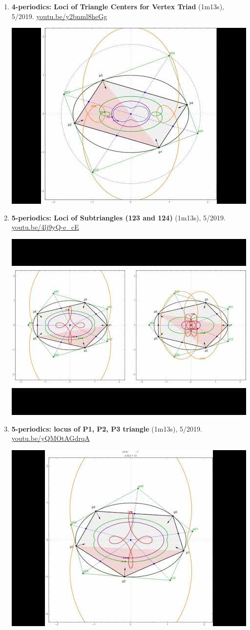 \documentclass[12pt]{article}
\begin{document}
\begin{enumerate}[resume]
\item \textbf{4-periodics: Loci of Triangle Centers for Vertex Triad} (1m13s), 5/2019. \href{https://youtu.be/y2bnml8heGg}{\url{youtu.be/y2bnml8heGg}}
\begin{center}\includegraphics[width=.5\textwidth]{pics/y2bnml8heGg.jpg}\end{center}
% 
\item \textbf{5-periodics: Loci of Subtriangles (123 and 124)} (1m13s), 5/2019. \href{https://youtu.be/4lj9yQ-e_cE}{\url{youtu.be/4lj9yQ-e\_cE}}
\begin{center}\includegraphics[width=.5\textwidth]{pics/4lj9yQ-e_cE.jpg}\end{center}
% 
\item \textbf{5-periodics: locus of P1, P2, P3 triangle} (1m13s), 5/2019. \href{https://youtu.be/yQMOtAGdrqA}{\url{youtu.be/yQMOtAGdrqA}}
\begin{center}\includegraphics[width=.5\textwidth]{pics/yQMOtAGdrqA.jpg}\end{center}

\end{enumerate}
\end{document}
